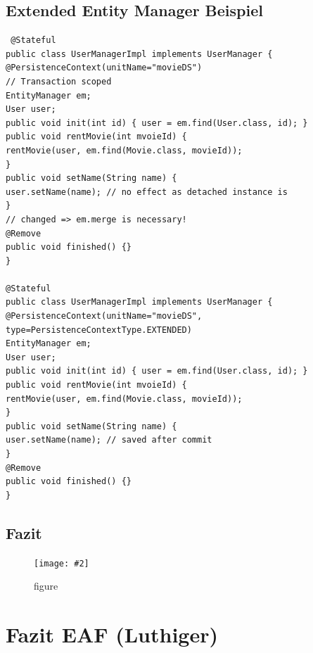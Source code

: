 \documentclass[a4paper,10pt]{scrreprt}
\newcommand{\pic}[2][figure]{\begin{figure}[h]
 \centering
 \texttt{[image: \#2]}
 \caption{#1}
\end{figure}
}
\begin{document}
\section{Extended Entity Manager Beispiel}
\begin{lstlisting}
 @Stateful
public class UserManagerImpl implements UserManager {
@PersistenceContext(unitName="movieDS")
// Transaction scoped
EntityManager em;
User user;
public void init(int id) { user = em.find(User.class, id); }
public void rentMovie(int mvoieId) {
rentMovie(user, em.find(Movie.class, movieId));
}
public void setName(String name) {
user.setName(name); // no effect as detached instance is
}
// changed => em.merge is necessary!
@Remove
public void finished() {}
}

@Stateful
public class UserManagerImpl implements UserManager {
@PersistenceContext(unitName="movieDS",
type=PersistenceContextType.EXTENDED)
EntityManager em;
User user;
public void init(int id) { user = em.find(User.class, id); }
public void rentMovie(int mvoieId) {
rentMovie(user, em.find(Movie.class, movieId));
}
public void setName(String name) {
user.setName(name); // saved after commit
}
@Remove
public void finished() {}
}
\end{lstlisting}

\section{Fazit}
\pic{fz.png}

\chapter{Fazit EAF (Luthiger)}
\end{document}
